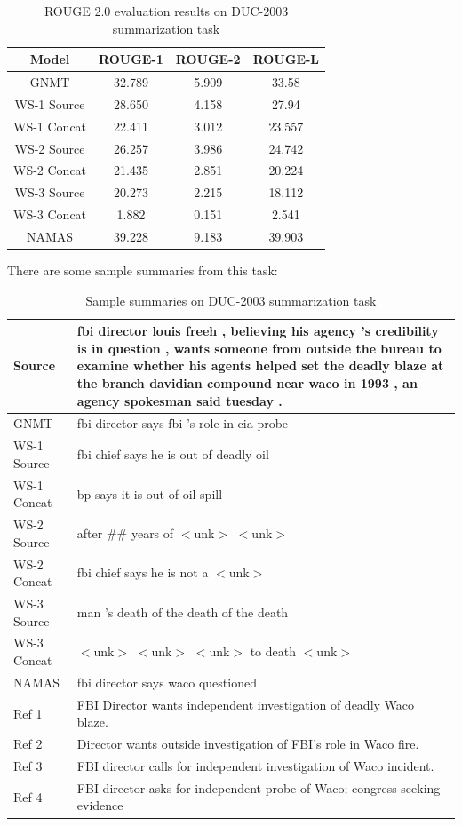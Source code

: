 \documentclass[letterpaper]{article} %
\begin{document}
\begin{table}[h]
	\begin{tabular}{c c c c}
		Model & ROUGE-1 & ROUGE-2 & ROUGE-L \\
		\hline
		GNMT & 32.789 & 5.909 & 33.58 \\
		WS-1 Source & 28.650 & 4.158 & 27.94 \\
		WS-1 Concat & 22.411 & 3.012 & 23.557 \\
		WS-2 Source & 26.257 & 3.986 & 24.742 \\
		WS-2 Concat & 21.435 & 2.851 & 20.224 \\
		WS-3 Source & 20.273 & 2.215 & 18.112 \\
		WS-3 Concat & 1.882 & 0.151 & 2.541 \\
		\hline
		NAMAS & 39.228 & 9.183 & 39.903
	\end{tabular}
	\caption{ROUGE 2.0 evaluation results on DUC-2003 summarization task}
	\label{table:rougeduc2003}
\end{table}

There are some sample summaries from this task:

\begin{table}[h]
	\begin{tabular}{p{40pt} p{170pt}}
		Source & fbi director louis freeh , believing his agency 's credibility is in question , wants someone from outside the bureau to examine whether his agents helped set the deadly blaze at the branch davidian compound near waco in 1993 , an agency spokesman said tuesday .\\
		\hline
		GNMT & fbi director says fbi 's role in cia probe \\
		WS-1 Source & fbi chief says he is out of deadly oil \\
		WS-1 Concat & bp says it is out of oil spill \\
		WS-2 Source & after \#\# years of $<$unk$>$ $<$unk$>$ \\
		WS-2 Concat & fbi chief says he is not a $<$unk$>$ \\
		WS-3 Source & man 's death of the death of the death \\
		WS-3 Concat & $<$unk$>$  $<$unk$>$  $<$unk$>$  to death $<$unk$>$  \\
		NAMAS & fbi director says waco questioned \\
		\hline
		Ref 1 & FBI Director wants independent investigation of deadly Waco blaze.\\
		Ref 2 & Director wants outside investigation of FBI's role in Waco fire.\\
		Ref 3 & FBI director calls for independent investigation of Waco incident.\\
		Ref 4 & FBI director asks for independent probe of Waco; congress seeking evidence
	\end{tabular}
	\caption{Sample summaries on DUC-2003 summarization task}
	\label{table:sampleduc2003}
\end{table}
\end{document}
